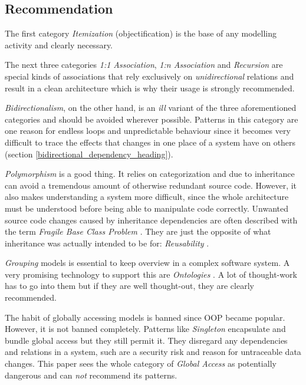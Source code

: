 %
%
%
%
%
%
%

\subsection{Recommendation}
\label{recommendation_heading}

The first category \emph{Itemization} (objectification) is the base of any
modelling activity and clearly necessary.

The next three categories \emph{1:1 Association}, \emph{1:n Association} and
\emph{Recursion} are special kinds of associations that rely exclusively on
\emph{unidirectional} relations and result in a clean architecture which is why
their usage is strongly recommended.

\emph{Bidirectionalism}, on the other hand, is an \emph{ill} variant of the three
aforementioned categories and should be avoided wherever possible. Patterns in
this category are one reason for endless loops and unpredictable behaviour since
it becomes very difficult to trace the effects that changes in one place of a
system have on others (section \ref{bidirectional_dependency_heading}).

\emph{Polymorphism} is a good thing. It relies on categorization and due to
inheritance can avoid a tremendous amount of otherwise redundant source code.
However, it also makes understanding a system more difficult, since the whole
architecture must be understood before being able to manipulate code correctly.
Unwanted source code changes caused by inheritance dependencies are often
described with the term \emph{Fragile Base Class Problem}
\cite[section \emph{Layers}]{buschmann}. They are just the opposite of what
inheritance was actually intended to be for: \emph{Reusability}
\cite[Vorwort]{gruhn}.

\emph{Grouping} models is essential to keep overview in a complex software
system. A very promising technology to support this are \emph{Ontologies}
\cite{hellerkunze}. A lot of thought-work has to go into them but if they are
well thought-out, they are clearly recommended.

The habit of globally accessing models is banned since OOP became popular.
However, it is not banned completely. Patterns like \emph{Singleton}
encapsulate and bundle global access but they still permit it. They disregard
any dependencies and relations in a system, such are a security risk and reason
for untraceable data changes. This paper sees the whole category of
\emph{Global Access} as potentially dangerous and can \emph{not} recommend its
patterns.

